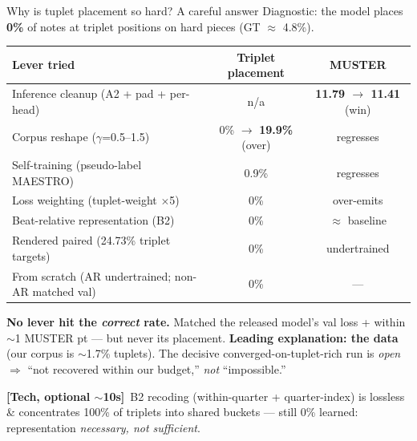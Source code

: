 \documentclass[aspectratio=169,11pt]{beamer}
\newcommand{\techtag}{{\color{labgreen}\footnotesize\textbf{[Tech, optional $\sim$10s]}}}
\begin{document}
\begin{frame}{Why is tuplet placement so hard? A careful answer}
  \footnotesize
  Diagnostic: the model places \textbf{0\%} of notes at triplet positions on hard pieces (GT $\approx$ 4.8\%).
  \vspace{0.3em}
  \begin{center}
  \begin{tabular}{@{}lcc@{}}
    \toprule
    Lever tried & Triplet placement & MUSTER \\
    \midrule
    Inference cleanup (A2 + pad + per-head) & n/a & \textbf{11.79 $\to$ 11.41} (win) \\
    Corpus reshape ($\gamma$=0.5--1.5)        & 0\% $\to$ \textbf{19.9\%} (over) & regresses \\
    Self-training (pseudo-label MAESTRO)      & 0.9\% & regresses \\
    Loss weighting (tuplet-weight $\times$5)  & 0\% & over-emits \\
    Beat-relative representation (B2)         & 0\% & $\approx$ baseline \\
    Rendered paired (24.73\% triplet targets) & 0\% & undertrained \\
    From scratch (AR undertrained; non-AR matched val) & 0\% & --- \\
    \bottomrule
  \end{tabular}
  \end{center}
  \vspace{0.2em}
  \begin{block}{}\footnotesize
    \textbf{No lever hit the \emph{correct} rate.} Matched the released model's val loss + within $\sim$1 MUSTER pt --- but never its placement. \textbf{Leading explanation: the data} (our corpus is $\sim$1.7\% tuplets). The decisive converged-on-tuplet-rich run is \emph{open} $\Rightarrow$ ``not recovered within our budget,'' \emph{not} ``impossible.''
  \end{block}
  \techtag\ \footnotesize B2 recoding (within-quarter + quarter-index) is lossless \& concentrates 100\% of triplets into shared buckets --- still 0\% learned: representation \emph{necessary, not sufficient}.

\end{frame}
\end{document}
